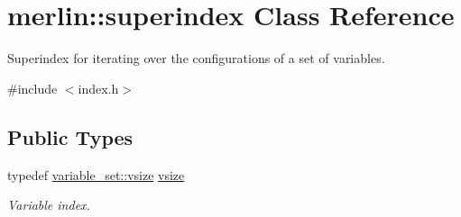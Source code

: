\hypertarget{classmerlin_1_1superindex}{}\section{merlin\+:\+:superindex Class Reference}
\label{classmerlin_1_1superindex}


Superindex for iterating over the configurations of a set of variables.  




{\ttfamily \#include $<$index.\+h$>$}

\subsection*{Public Types}
\begin{DoxyCompactItemize}
\item 
typedef \hyperlink{classmerlin_1_1variable__set_a05d7a8291564fa7fb236a5e9cb65c734}{variable\+\_\+set\+::vsize} \hyperlink{classmerlin_1_1superindex_a4e63d0617c6b351c664cdfd406686d62}{vsize}\hypertarget{classmerlin_1_1superindex_a4e63d0617c6b351c664cdfd406686d62}{}\label{classmerlin_1_1superindex_a4e63d0617c6b351c664cdfd406686d62}

\begin{DoxyCompactList}\small\item\em Variable index. \end{DoxyCompactList}\end{DoxyCompactItemize}
